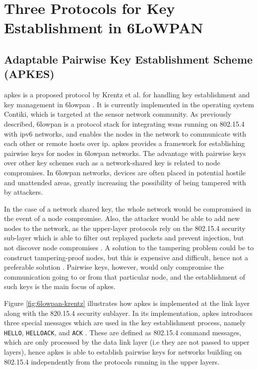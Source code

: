 \chapter{Three Protocols for Key Establishment in 6LoWPAN}
\label{chp:protocols}


\section{Adaptable Pairwise Key Establishment Scheme (APKES)}


\gls{apkes} is a proposed protocol by Krentz et al. for handling key establishment and key management in \gls{6lowpan} \cite{krentz20136lowpan}. It is currently implemented in the operating system Contiki, which is targeted at the sensor network community. As previously described, \gls{6lowpan} is a protocol stack for integrating \gls{wsn}s running on 802.15.4 with \gls{ip}v6 networks, and enables the nodes in the network to communicate with each other or remote hosts over \gls{ip}. \gls{apkes} provides a framework for establishing pairwise keys for nodes in \gls{6lowpan} networks. The advantage with pairwise keys over other key schemes such as a network-shared key is related to node compromises. In \gls{6lowpan} networks, devices are often placed in potential hostile and unattended areas, greatly increasing the possibility of being tampered with by attackers.

In the case of a network shared key, the whole network would be compromised in the event of a node compromise. Also, the attacker would be able to add new nodes to the network, as the upper-layer protocols rely on the 802.15.4 security sub-layer which is able to filter out replayed packets and prevent injection, but not discover node compromises \cite{krentz20136lowpan}. A solution to the tampering problem could be to construct tampering-proof nodes, but this is expensive and difficult, hence not a preferable solution \cite{anderson1996tamper}. Pairwise keys, however, would only compromise the communication going to or from that particular node, and the establishment of such keys is the main focus of \gls{apkes}.

Figure \ref{fig:6lowpan-krentz} illustrates how \gls{apkes} is implemented at the link layer along with the 820.15.4 security sublayer. In its implementation, \gls{apkes} introduces three special messages which are used in the key establishment process, namely \texttt{HELLO}, \texttt{HELLOACK}, and \texttt{ACK} \cite{krentz20136lowpan}. These are defined as 802.15.4 command messages, which are only processed by the data link layer (i.e they are not passed to upper layers), hence \gls{apkes} is able to establish pairwise keys for networks building on 802.15.4 independently from the protocols running in the upper layers.

